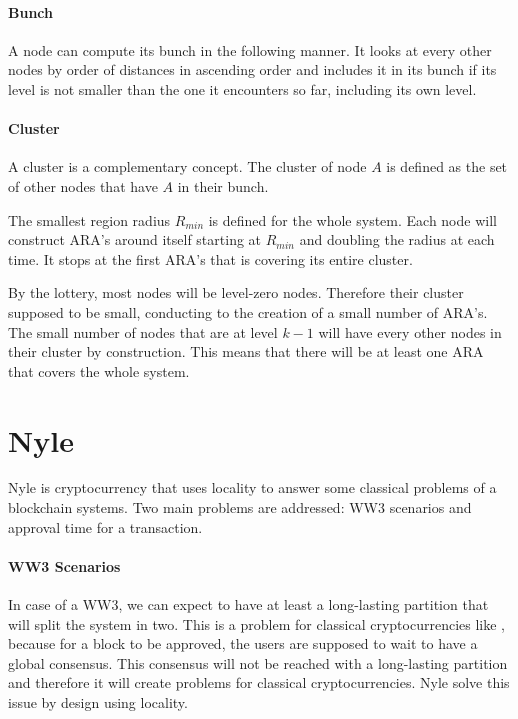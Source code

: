 \documentclass[a4paper,11pt,oneside]{report}
\begin{document}
\paragraph{Bunch} A node can compute its bunch in the following manner. It
looks at every other nodes by order of distances in ascending order and
includes it in its bunch if its level is not smaller than the one it encounters
so far, including its own level. 

\paragraph{Cluster} A cluster is a complementary concept. The cluster of node
$A$ is defined as the set of other nodes that have $A$ in their bunch. 

The smallest region radius $R_{min}$ is defined for the whole system. Each node
will construct ARA's around itself starting at $R_{min}$ and doubling the
radius at each time. It stops at the first ARA's that is covering its entire
cluster. 

By the lottery, most nodes will be level-zero nodes. Therefore their cluster
supposed to be small, conducting to the creation of a small number of ARA's.
The small number of nodes that are at level $k-1$ will have every other nodes
in their cluster by construction. This means that there will be at least one
ARA that covers the whole system. 

\section{Nyle}

Nyle is cryptocurrency that uses locality to answer some classical problems of
a blockchain systems. Two main problems are addressed: WW3 scenarios and
approval time for a transaction.
 
\paragraph{WW3 Scenarios} \label{WW3} In case of a WW3, we can expect to have
at least a long-lasting partition that will split the system in two. This is a
problem for classical cryptocurrencies like \cite{Nakamoto2009}, because for a
block to be approved, the users are supposed to wait to have a global
consensus. This consensus will not be reached with a long-lasting partition and
therefore it will create problems for classical cryptocurrencies. Nyle solve
this issue by design using locality.
\end{document}
